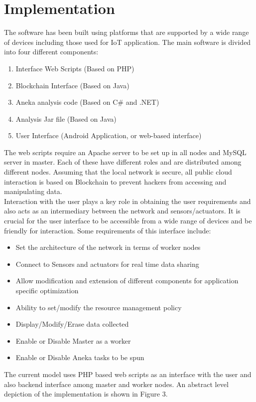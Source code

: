 \documentclass[AMA,STIX1COL]{WileyNJD-v2}
\begin{document}
\section{Implementation}
The software has been built using platforms that are supported by a wide range of devices including those used for IoT application. The main software is divided into four different components:
\begin{enumerate}
\item Interface Web Scripts (Based on PHP)
\item Blockchain Interface (Based on Java)
\item Aneka analysis code (Based on C\# and .NET)
\item Analysis Jar file (Based on Java)
\item User Interface (Android Application, or web-based interface)
\end{enumerate}
The web scripts require an Apache server to be set up in all nodes and MySQL server in master. Each of these have different roles and are distributed among different nodes. Assuming that the local network is secure, all public cloud interaction is based on Blockchain to prevent hackers from accessing and manipulating data.\\
Interaction with the user plays a key role in obtaining the user requirements and also acts as an intermediary between the network and sensors/actuators. It is crucial for the user interface to be accessible from a wide range of devices and be friendly for interaction. Some requirements of this interface include:
\begin{itemize}
\item Set the architecture of the network in terms of worker nodes
\item Connect to Sensors and actuators for real time data sharing
\item Allow modification and extension of different components for application specific optimization
\item Ability to set/modify the resource management policy
\item Display/Modify/Erase data collected
\item Enable or Disable Master as a worker
\item Enable or Disable Aneka tasks to be spun
\end{itemize}
The current model uses PHP based web scripts as an interface with the user and also backend interface among master and worker nodes. An abstract level depiction of the implementation is shown in Figure 3.
\end{document}
